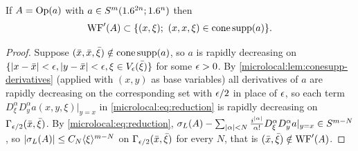 \begin{lemma}\label{microlocal:lem:ess-amplitude}
  If $A=\operatorname{Op}(a)$ with $a\in S^m(1.6^{2n};1.6^n)$ then
  \begin{equation*}
    \WFp(A)\subset\{(x,\xi);\ (x,x,\xi)\in\conesupp(a)\}.
  \end{equation*}
\end{lemma}
\begin{proof}
  Suppose $(\bar x,\bar x,\bar\xi)\notin\operatorname{cone\,supp}(a)$, so $a$ is rapidly
  decreasing on $\{\lvert x-\bar x\rvert<\epsilon,\lvert y-\bar x\rvert<\epsilon,\xi\in
  V_\epsilon(\bar\xi)\}$ for some $\epsilon>0$. By
  \cref{microlocal:lem:conesupp-derivatives} (applied with $(x,y)$ as base
  variables) all derivatives of $a$ are rapidly decreasing on the
  corresponding set with $\epsilon/2$ in place of $\epsilon$, so each term
  $D^\alpha_\xi D^\alpha_ya(x,y,\xi)|_{y=x}$ in \eqref{microlocal:eq:reduction}
  is rapidly decreasing on $\Gamma_{\epsilon/2}(\bar x,\bar\xi)$. By
  \eqref{microlocal:eq:reduction},
  $\sigma_L(A)-\sum_{\lvert \alpha\rvert<N}\frac{i^{\lvert \alpha\rvert}}{\alpha!}D^\alpha_\xi
  D^\alpha_ya|_{y=x}\in S^{m-N}$, so
  $\lvert \sigma_L(A)\rvert\le C_N\langle \xi\rangle^{m-N}$ on $\Gamma_{\epsilon/2}(\bar
  x,\bar\xi)$ for every $N$, that is $(\bar x,\bar\xi)\notin\operatorname{WF}'(A)$.
\end{proof}

